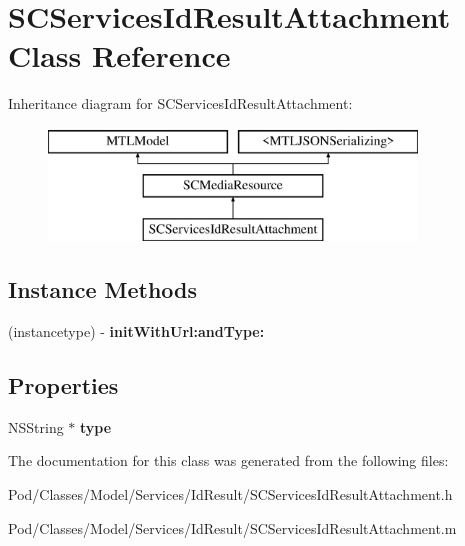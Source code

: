 \hypertarget{interface_s_c_services_id_result_attachment}{}\section{S\+C\+Services\+Id\+Result\+Attachment Class Reference}
\label{interface_s_c_services_id_result_attachment}
Inheritance diagram for S\+C\+Services\+Id\+Result\+Attachment\+:\begin{figure}[H]
\begin{center}
\leavevmode
\includegraphics[height=3.000000cm]{interface_s_c_services_id_result_attachment}
\end{center}
\end{figure}
\subsection*{Instance Methods}
\begin{DoxyCompactItemize}
\item 
(instancetype) -\/ {\bfseries init\+With\+Url\+:and\+Type\+:}\hypertarget{interface_s_c_services_id_result_attachment_acc493047ea9243f8a1d80feeb1d6ed7d}{}\label{interface_s_c_services_id_result_attachment_acc493047ea9243f8a1d80feeb1d6ed7d}

\end{DoxyCompactItemize}
\subsection*{Properties}
\begin{DoxyCompactItemize}
\item 
N\+S\+String $\ast$ {\bfseries type}\hypertarget{interface_s_c_services_id_result_attachment_aef8f508501375e719c1858686b71ae50}{}\label{interface_s_c_services_id_result_attachment_aef8f508501375e719c1858686b71ae50}

\end{DoxyCompactItemize}


The documentation for this class was generated from the following files\+:\begin{DoxyCompactItemize}
\item 
Pod/\+Classes/\+Model/\+Services/\+Id\+Result/S\+C\+Services\+Id\+Result\+Attachment.\+h\item 
Pod/\+Classes/\+Model/\+Services/\+Id\+Result/S\+C\+Services\+Id\+Result\+Attachment.\+m\end{DoxyCompactItemize}
